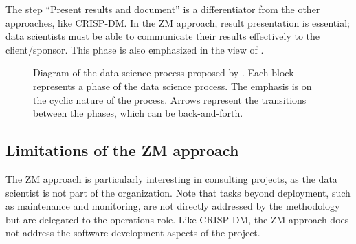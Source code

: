 The step ``Present results and document'' is a differentiator from the other approaches, like
CRISP-DM.  In the ZM approach, result presentation is essential; data scientists must be able
to communicate their results effectively to the client/sponsor.  This phase is also
emphasized in the view of \textcite{Wickham2023}.

\begin{figure}
  \centering
  \caption{
  Diagram of the data science process proposed by \textcite{Zumel2019}.
  Each block represents a phase of the data science process.  The emphasis is on the
  cyclic nature of the process.  Arrows represent the transitions between the phases, which
  can be back-and-forth.
  }
  \label{fig:zumel}
\end{figure}

\subsection{Limitations of the ZM approach}

The ZM approach is particularly interesting in consulting projects, as the data scientist
is not part of the organization.  Note that tasks beyond deployment, such as maintenance and
monitoring, are not directly addressed by the methodology but are delegated to the operations
role.  Like CRISP-DM, the ZM approach does not address the software development aspects of
the project.

